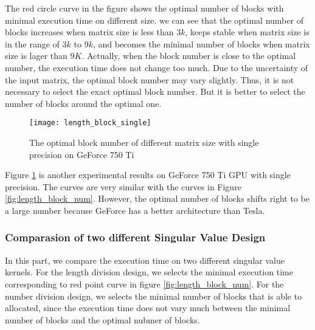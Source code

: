 The red circle curve in the figure shows the optimal number of blocks with minimal execution time on different size.
we can see that the optimal number of blocks increases when matrix size is less than $3k$,
keeps stable when matrix size is in the range of $3k$ to $9k$,
and becomes the minimal number of blocks when matrix size is lager than $9K$.
Actually, when the block number is close to the optimal number, the execution time does not change too much.
Due to the uncertainty of the input matrix, the optimal block number may vary slightly.
Thus, it is not necessary to select the exact optimal block number.
But it is better to select the number of blocks around the optimal one.

\begin{figure}[hbpt]
\centering
\texttt{[image: length\_block\_single]}
\caption{The optimal block number of different matrix size with single precision on GeForce 750 Ti}
\label{fig:length_block_single}
\end{figure}
Figure \ref{fig:length_block_single} is another experimental results on GeForce 750 Ti GPU with single precision.
The curves are very similar with the curves in Figure \ref{fig:length_block_num}.
However, the optimal number of blocks shifts right to be a large number because GeForce has a better architecture than Tesla.



\subsubsection{Comparasion of two different Singular Value Design}
In this part, we compare the execution time on two different singular value kernels.
For the length division design, we selects the minimal execution time corresponding to red point curve in figure \ref{fig:length_block_num}.
For the number division design, we selects the minimal number of blocks that is able to allocated, since the execution time does not vary much between the minimal number of blocks and the optimal nubmer of blocks.

